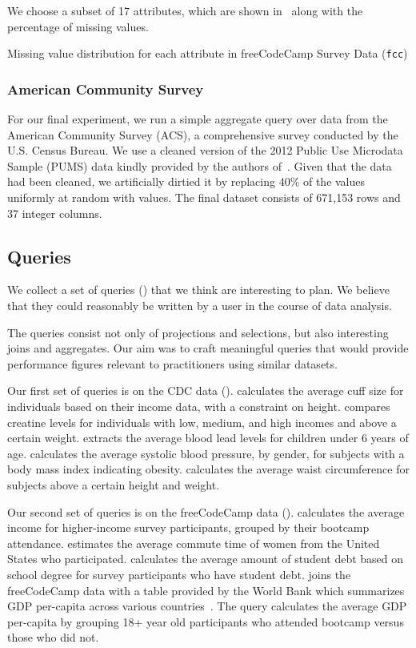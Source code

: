 We choose a subset of 17 attributes, which are shown in~ along
with the percentage of missing values.

\begin{table}
  \centering
  
  \caption{Missing value distribution for each attribute in freeCodeCamp Survey Data (\texttt{fcc})}\label{table:fcc-description} 
\end{table}

\subsubsection{American Community Survey}
For our final experiment, we run a simple aggregate query over data from the American
Community Survey (ACS), a comprehensive survey conducted by the U.S.
Census Bureau. We use a cleaned version of the 2012 Public Use Microdata Sample (PUMS)
data kindly provided by the authors of~\cite{akande2015empirical}. Given that the data had
been cleaned, we artificially dirtied it by replacing 40\% of the values uniformly at random with \nullv{} values.
The final dataset consists of 671,153 rows and 37 integer columns.

\subsection{Queries}
We collect a set of queries () that we think are interesting to plan.
We believe that they could reasonably be written by a user in the course of data analysis.

The queries consist not only of projections and selections, but also
interesting joins and aggregates. Our aim was to craft meaningful queries that would
provide performance figures relevant to practitioners using similar datasets.

Our first set of queries is on the CDC data ().
 calculates the average cuff size for individuals based on their income data, with a constraint on height.
 compares creatine levels for individuals with low, medium, and high incomes and above a certain weight.
 extracts the average blood lead levels for children under 6 years of age.
 calculates the average systolic blood pressure, by gender, for subjects with a body mass index indicating obesity. 
 calculates the average waist circumference for subjects above a certain height and weight.

Our second set of queries is on the freeCodeCamp data ().
 calculates the average income for higher-income survey participants, grouped by their bootcamp attendance.
 estimates the average commute time of women from the United States who participated.
 calculates the average amount of student debt based on school degree for survey participants who have student debt.
 joins the freeCodeCamp data with a table provided by the World Bank which summarizes GDP per-capita across various countries~\cite{worldbank-data}.
The query calculates the average GDP per-capita by grouping 18+ year old participants who attended bootcamp versus those who did not.

